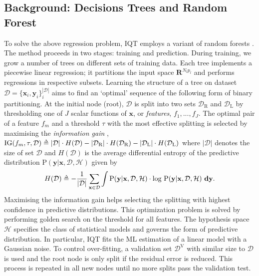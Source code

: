 \subsection{Background: Decisions Trees and Random Forest}
To solve the above regression problem, IQT employs a variant of random forests \cite{breiman2001random}. The method proceeds in two stages: training and prediction. 
%
%
During training, we grow a number of trees on different sets of training data. Each tree implements a piecewise linear regression; it partitions the input space $\mathbf{R}^{N_lp_l}$ and performs regressions in respective subsets. Learning the structure of a tree on dataset $\mathcal{D}  = \{\mathbf{x}_i, \mathbf{y}_i\}_{i}^{|\mathcal{D}|}$ aims to find an `optimal' sequence of the following form of binary partitioning. At the initial node (root), $\mathcal{D}$ is split into two sets $\mathcal{D}_{\text{R}}$ and $\mathcal{D}_{\text{L}}$ by thresholding one of $J$ scalar functions of $\mathbf{x}$, or \textit{features}, $f_1,...,f_J$. The optimal pair of a feature $f_m$ and a threshold $\tau$ with the most effective splitting is selected by maximising the \textit{information gain} \cite{criminisi2013decision}, $\text{IG}(f_m, \tau,\mathcal{D}) \delequal |\mathcal{D}|\cdot H(\mathcal{D}) - |\mathcal{D}_\text{R}|\cdot H(\mathcal{D}_\text{R}) - |\mathcal{D}_\text{L}|\cdot H(\mathcal{D}_\text{L})$
where  $|\mathcal{D}|$ denotes the size of set $\mathcal{D}$ and $H(\mathcal{D})$ is the average differential entropy of the predictive distribution $\text{P}(\textbf{y}|\textbf{x}, \mathcal{D}, \mathcal{H})$ given by
\begin{equation}\label{eq:meanentropy}
H(\mathcal{D}) \delequal -\frac{1}{|\mathcal{D}|}\sum_{\mathbf{x}\in \mathcal{D}} \int\text{P}(\textbf{y}|\textbf{x}, \mathcal{D}, \mathcal{H})\cdot\text{log} \ \text{P}(\textbf{y}|\textbf{x}, \mathcal{D}, \mathcal{H})\ \mathbf{dy}.
\end{equation}
Maximising the information gain helps selecting the splitting with highest confidence in predictive distributions. This optimization problem is solved by performing golden search on the threshold for all features. The hypothesis space $\mathcal{H}$ specifies the class of statistical models and governs the form of predictive distribution. In particular, IQT fits the ML estimation of a linear model with a Gaussian noise. To control over-fitting, a validation set $\mathcal{D}^{\text{V}}$ with similar size to $\mathcal{D}$ is used and the root node is only split if the residual error is reduced. This process is repeated in all new nodes until no more splits pass the validation test. 

